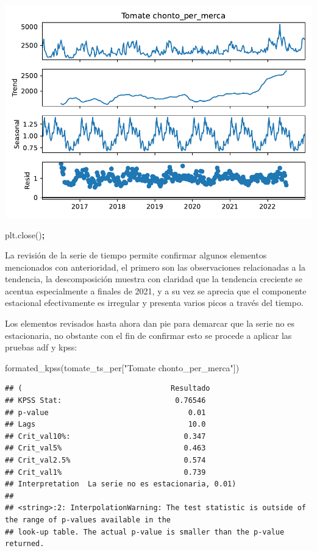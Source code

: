 \documentclass[
]{book}
\newenvironment{Shaded}{\begin{snugshade}}{\end{snugshade}}
\newcommand{\NormalTok}[1]{#1}
\newcommand{\OperatorTok}[1]{\textcolor[rgb]{0.81,0.36,0.00}{\textbf{#1}}}
\newcommand{\StringTok}[1]{\textcolor[rgb]{0.31,0.60,0.02}{#1}}
\begin{document}
\includegraphics{bookdown-demo_files/figure-latex/unnamed-chunk-122-111.pdf}

\begin{Shaded}
\begin{Highlighting}[]
\NormalTok{plt.close()}\OperatorTok{;}
\end{Highlighting}
\end{Shaded}

La revisión de la serie de tiempo permite confirmar algunos elementos mencionados con anterioridad, el primero son las observaciones relacionadas a la tendencia, la descomposición muestra con claridad que la tendencia creciente se acentua especialmente a finales de 2021, y a su vez se aprecia que el componente estacional efectivamente es irregular y presenta varios picos a través del tiempo.

Los elementos revisados hasta ahora dan pie para demarcar que la serie no es estacionaria, no obstante con el fin de confirmar esto se procede a aplicar las pruebas adf y kpss:

\begin{Shaded}
\begin{Highlighting}[]

\NormalTok{formated\_kpss(tomate\_ts\_per[}\StringTok{"Tomate chonto\_per\_merca"}\NormalTok{])}
\end{Highlighting}
\end{Shaded}

\begin{verbatim}
## (                                  Resultado
## KPSS Stat:                          0.76546
## p-value                                0.01
## Lags                                   10.0
## Crit_val10%:                          0.347
## Crit_val5%                            0.463
## Crit_val2.5%                          0.574
## Crit_val1%                            0.739
## Interpretation  La serie no es estacionaria, 0.01)
## 
## <string>:2: InterpolationWarning: The test statistic is outside of the range of p-values available in the
## look-up table. The actual p-value is smaller than the p-value returned.
\end{verbatim}
\end{document}

